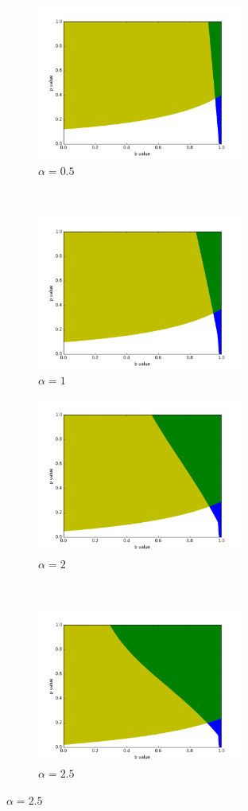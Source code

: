 \begin{figure}[t!]
\centering
\begin{subfigure}[t]{0.5\textwidth}
\centering
\includegraphics[height=2in]{./figures/bp_pair_both_al0p5.png}
\caption{$\alpha = 0.5$}
\end{subfigure}%
~ 
\begin{subfigure}[t]{0.5\textwidth}
\centering
\includegraphics[height=2in]{./figures/bp_pair_both_al1p0.png}
\caption{$\alpha = 1$}
\end{subfigure}
\centering
\begin{subfigure}[t]{0.5\textwidth}
\centering
\includegraphics[height=2in]{./figures/bp_pair_both_al2p0.png}
\caption{$\alpha = 2$}
\end{subfigure}%
~ 
\begin{subfigure}[t]{0.5\textwidth}
\centering
\includegraphics[height=2in]{./figures/bp_pair_both_al2p5.png}
\caption{$\alpha = 2.5$}
\end{subfigure}


\end{figure}
